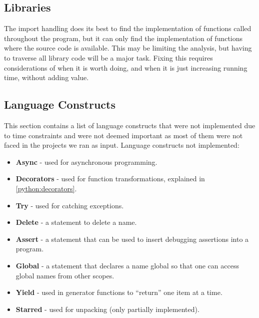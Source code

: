 \subsection{Libraries}
The import handling does its best to find the implementation of functions called throughout the program, but it can only find the implementation of functions where the source code is available.
This may be limiting the analysis, but having to traverse all library code will be a major task.
Fixing this requires considerations of when it is worth doing, and when it is just increasing running time, without adding value.

\subsection{Language Constructs}
This section contains a list of language constructs that were not implemented due to time constraints and were not deemed important as most of them were not faced in the projects we ran as input.
Language constructs not implemented:
\begin{itemize}
\item \textbf{Async} - used for asynchronous programming.\cite{python_async}
\item \textbf{Decorators} - used for function transformations, explained in \cref{python:decorators}.
\item \textbf{Try} - used for catching exceptions.\cite{python_exception}
\item \textbf{Delete} - a statement to delete a name.\cite{python_delete}
\item \textbf{Assert} - a statement that can be used to insert debugging assertions into a program.\cite{python_assert}
\item \textbf{Global} - a statement that declares a name global so that one can access global names from other scopes.\cite{python_global}
\item \textbf{Yield} - used in generator functions to ``return'' one item at a time.\cite{python_yield}
\item \textbf{Starred} - used for unpacking (only partially implemented).\cite{python_unpacking}
\end{itemize}

